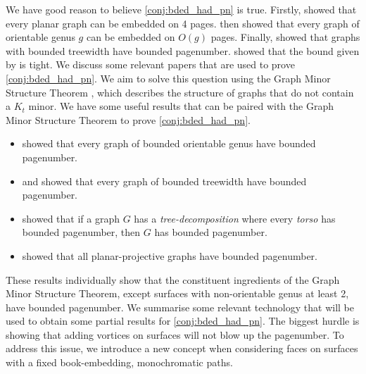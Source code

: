 We have good reason to believe \cref{conj:bded_had_pn} is true. Firstly, \textcite{yannakakisEmbeddingPlanarGraphs1989} showed that every planar graph can be embedded on 4 pages. \textcite{heathPagenumberGenusGraphs1992} then showed that every graph of orientable genus $g$ can be embedded on $O(g)$ pages. Finally, \textcite{ganleyPagenumberTrees2001} showed that graphs with bounded treewidth have bounded pagenumber. \textcite{dujmovicGraphTreewidthGeometric2007} showed that the bound given by \citeauthor{ganleyPagenumberTrees2001} is tight.
We discuss some relevant papers that are used to prove \cref{conj:bded_had_pn}.
We aim to solve this question using the Graph Minor Structure Theorem \cite{robertsonGraphMinorsXVI2003}, which describes the structure of graphs that do not contain a \(K_t\) minor. 
We have some useful results that can be paired with the Graph Minor Structure Theorem to prove \cref{conj:bded_had_pn}.
\begin{itemize}
	\item \textcite{heathPagenumberGenusGraphs1992} showed that every graph of bounded orientable genus have bounded pagenumber.
	\item \textcite{ganleyPagenumberTrees2001} and \textcite{dujmovicGraphTreewidthGeometric2007} showed that every graph of bounded treewidth have bounded pagenumber.
	\item \textcite{hickingbothamStackNumberCliqueSum2023} showed that if a graph \(G\) has a \textit{tree-decomposition} where every \textit{torso} has bounded pagenumber, then \(G\) has bounded pagenumber.
	\item \textcite{nakamotoBookEmbeddingProjectiveplanar2015} showed that all planar-projective graphs have bounded pagenumber.
\end{itemize}
These results individually show that the constituent ingredients of the Graph Minor Structure Theorem, except surfaces with non-orientable genus at least 2, have bounded pagenumber. We summarise some relevant technology that will be used to obtain some partial results for \cref{conj:bded_had_pn}. 
The biggest hurdle is showing that adding vortices on surfaces will not blow up the pagenumber. To address this issue, we introduce a new concept when considering faces on surfaces with a fixed book-embedding, monochromatic paths. 
